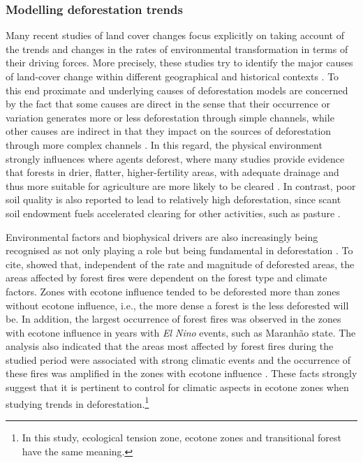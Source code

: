 \subsubsection{Modelling deforestation trends}  %


Many recent studies of land cover changes focus explicitly on taking account of the trends and changes in the rates of environmental transformation in terms of their driving forces. More precisely, these studies try to identify the major causes of land-cover change within different geographical and historical contexts \citep{GEIST}. To this end proximate and underlying causes of deforestation models are concerned by the fact that some causes are direct in the sense that their occurrence or variation generates more or less deforestation through simple channels, while other causes are indirect in that they impact on the sources of deforestation through more complex channels \citep{MOTEL}. In this regard, the physical environment strongly influences where agents deforest, where many studies provide evidence that forests in drier, flatter, higher-fertility areas, with adequate drainage and thus more suitable for agriculture are more likely to be cleared \citep{ANGELSEN4}. In contrast, poor soil quality is also reported to lead to relatively high deforestation, since scant soil endowment fuels accelerated clearing for other activities, such as pasture \citep{GEIST,COSTA}. 

Environmental factors and  biophysical drivers are also increasingly being recognised as not only playing a role but being fundamental in deforestation \citep{GEIST}. To cite, \citet{BARNI} showed that, independent of the rate and magnitude of deforested areas, the areas affected by forest fires were dependent on the forest type and climate factors. Zones with ecotone influence tended to be deforested more than zones without ecotone influence, i.e., the more dense a forest is the less deforested will be. In addition, the largest occurrence of forest fires was observed in the zones with ecotone influence in years with \textit{El Nino} events, such as Maranhão state. The analysis also indicated that the areas most affected by forest fires during the studied period were associated with strong climatic events and the occurrence of these fires was amplified in the zones with ecotone influence \citep{BARNI}. These facts strongly suggest that it is pertinent to control for climatic aspects in ecotone zones when studying trends in deforestation.\footnote{In this study, ecological tension zone, ecotone zones and transitional forest have the same meaning. } 



